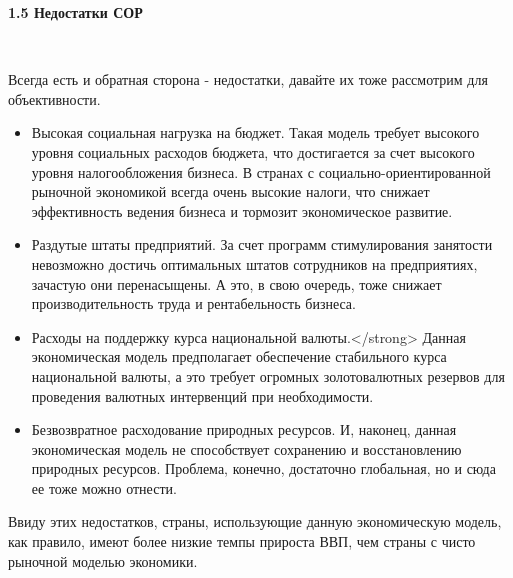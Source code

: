\documentclass[14pt,a4paper]{article}
\begin{document}
    \begin{center}
        \textbf{1.5 Недостатки СОР}
    \end{center}
    \\
    \par
    Всегда есть и обратная сторона - недостатки, давайте их тоже рассмотрим для объективности.
    \begin{itemize}
        \item Высокая социальная нагрузка на бюджет. Такая модель требует высокого
        уровня социальных расходов бюджета, что достигается за счет высокого уровня
        налогообложения бизнеса. В странах с социально-ориентированной рыночной экономикой
        всегда очень высокие налоги, что снижает эффективность ведения бизнеса и тормозит
        экономическое развитие.
        \item Раздутые штаты предприятий. За счет программ стимулирования занятости
        невозможно достичь оптимальных штатов сотрудников на предприятиях, зачастую они
        перенасыщены. А это, в свою очередь, тоже снижает производительность труда и
        рентабельность бизнеса.
        \item Расходы на поддержку курса национальной валюты.</strong> Данная экономическая
        модель предполагает обеспечение стабильного курса национальной валюты, а это требует
        огромных золотовалютных резервов для проведения валютных интервенций при необходимости.
        \item Безвозвратное расходование природных ресурсов. И, наконец, данная
        экономическая модель не способствует сохранению и восстановлению природных ресурсов.
        Проблема, конечно, достаточно глобальная, но и сюда ее тоже можно отнести.
    \end{itemize}
    \par
    Ввиду этих недостатков, страны, использующие данную экономическую модель, как
    правило, имеют более низкие темпы прироста ВВП, чем страны с чисто рыночной моделью
    экономики.
\end{document}
